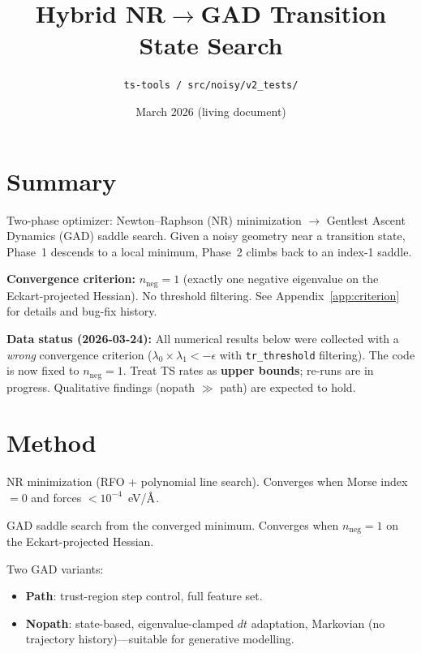 \documentclass[11pt,a4paper]{article}
\title{Hybrid NR$\to$GAD Transition State Search}
\author{\texttt{ts-tools / src/noisy/v2\_tests/}}
\date{March 2026 (living document)}
\newcommand{\eval}{\lambda}
\newcommand{\angstrom}{\text{\r{A}}}
\begin{document}
\maketitle

\section{Summary}

Two-phase optimizer: Newton--Raphson (NR) minimization $\to$ Gentlest Ascent
Dynamics (GAD) saddle search.  Given a noisy geometry near a transition state,
Phase~1 descends to a local minimum, Phase~2 climbs back to an index-1 saddle.

\textbf{Convergence criterion:} $n_\text{neg} = 1$ (exactly one negative
eigenvalue on the Eckart-projected Hessian).  No threshold filtering.
See Appendix~\ref{app:criterion} for details and bug-fix history.

\medskip
\noindent\colorbox{yellow!30}{\parbox{0.93\textwidth}{%
\textbf{Data status (2026-03-24):} All numerical results below were collected
with a \emph{wrong} convergence criterion ($\eval_0 \times \eval_1 < -\epsilon$
with \texttt{tr\_threshold} filtering).  The code is now fixed to $n_\text{neg}=1$.
Treat TS rates as \textbf{upper bounds}; re-runs are in progress.
Qualitative findings (nopath $\gg$ path) are expected to hold.
}}

\section{Method}
\label{sec:method}

\begin{description}[nosep,leftmargin=1.5cm,style=sameline]
  \item[Phase 1] NR minimization (RFO + polynomial line search).
        Converges when Morse index~$= 0$ and forces $< 10^{-4}$~eV/$\angstrom$.
  \item[Phase 2] GAD saddle search from the converged minimum.
        Converges when $n_\text{neg} = 1$ on the Eckart-projected Hessian.
\end{description}

\noindent Two GAD variants:
\begin{itemize}[nosep]
  \item \textbf{Path}: trust-region step control, full feature set.
  \item \textbf{Nopath}: state-based, eigenvalue-clamped $dt$ adaptation,
        Markovian (no trajectory history)---suitable for generative modelling.
\end{itemize}
\end{document}
